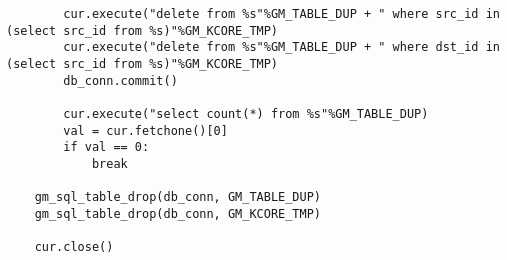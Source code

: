 \documentclass[11pt]{article}
\begin{document}
\begin{lstlisting}
        cur.execute("delete from %s"%GM_TABLE_DUP + " where src_id in (select src_id from %s)"%GM_KCORE_TMP)
        cur.execute("delete from %s"%GM_TABLE_DUP + " where dst_id in (select src_id from %s)"%GM_KCORE_TMP)
        db_conn.commit()  

        cur.execute("select count(*) from %s"%GM_TABLE_DUP)
        val = cur.fetchone()[0]
        if val == 0:
            break

    gm_sql_table_drop(db_conn, GM_TABLE_DUP)
    gm_sql_table_drop(db_conn, GM_KCORE_TMP)

    cur.close()
\end{lstlisting}
\end{document}
